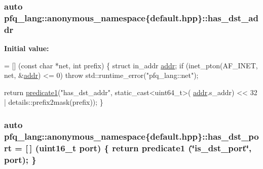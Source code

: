 \hypertarget{namespacepfq__lang_1_1anonymous__namespace_02default_8hpp_03_af223a0513ceffa69c0b8535a7cca12da}{
\subsubsection[{has\-\_\-dst\-\_\-addr}]{\setlength{\rightskip}{0pt plus 5cm}auto pfq\-\_\-lang\-::anonymous\-\_\-namespace\{default.\-hpp\}\-::has\-\_\-dst\-\_\-addr}}\label{namespacepfq__lang_1_1anonymous__namespace_02default_8hpp_03_af223a0513ceffa69c0b8535a7cca12da}
{\bfseries Initial value\-:}
\begin{DoxyCode}
= [] (\textcolor{keyword}{const} \textcolor{keywordtype}{char} *net, \textcolor{keywordtype}{int} prefix)
        \{
            \textcolor{keyword}{struct }in\_addr \hyperlink{namespacepfq__lang_1_1anonymous__namespace_02default_8hpp_03_aafce8334d1be83bff9a2115439c8c453}{addr};
            \textcolor{keywordflow}{if} (inet\_pton(AF\_INET, net, &\hyperlink{namespacepfq__lang_1_1anonymous__namespace_02default_8hpp_03_aafce8334d1be83bff9a2115439c8c453}{addr}) <= 0)
                \textcolor{keywordflow}{throw} std::runtime\_error(\textcolor{stringliteral}{"pfq\_lang::net"});

            \textcolor{keywordflow}{return} \hyperlink{namespacepfq__lang_ae23a03cee94b5ddfde4a8d2e5c521f0e}{predicate1}(\textcolor{stringliteral}{"has\_dst\_addr"}, static\_cast<uint64\_t>(
      \hyperlink{namespacepfq__lang_1_1anonymous__namespace_02default_8hpp_03_aafce8334d1be83bff9a2115439c8c453}{addr}.s\_addr) << 32 | details::prefix2mask(prefix));
        \}
\end{DoxyCode}
\hypertarget{namespacepfq__lang_1_1anonymous__namespace_02default_8hpp_03_accc3aed36db0c762dd6c95f3706c8741}{
\subsubsection[{has\-\_\-dst\-\_\-port}]{\setlength{\rightskip}{0pt plus 5cm}auto pfq\-\_\-lang\-::anonymous\-\_\-namespace\{default.\-hpp\}\-::has\-\_\-dst\-\_\-port = \mbox{[}$\,$\mbox{]} (uint16\-\_\-t {\bf port}) \{ return {\bf predicate1} (\char`\"{}is\-\_\-dst\-\_\-port\char`\"{}, port); \}}}\label{namespacepfq__lang_1_1anonymous__namespace_02default_8hpp_03_accc3aed36db0c762dd6c95f3706c8741}
